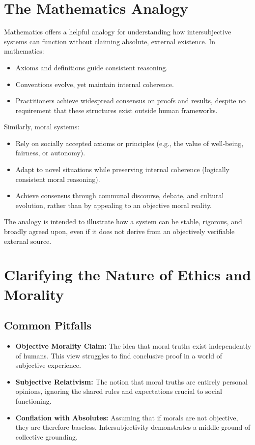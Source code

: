 \documentclass{article}
\begin{document}
\section{The Mathematics Analogy}

Mathematics offers a helpful analogy for understanding how intersubjective systems can function without claiming absolute, external existence. In mathematics:

\begin{itemize}
  \item Axioms and definitions guide consistent reasoning.
  \item Conventions evolve, yet maintain internal coherence.
  \item Practitioners achieve widespread consensus on proofs and results, despite no requirement that these structures exist outside human frameworks.
\end{itemize}

Similarly, moral systems:

\begin{itemize}
  \item Rely on socially accepted axioms or principles (e.g., the value of well-being, fairness, or autonomy).
  \item Adapt to novel situations while preserving internal coherence (logically consistent moral reasoning).
  \item Achieve consensus through communal discourse, debate, and cultural evolution, rather than by appealing to an objective moral reality.
\end{itemize}

The analogy is intended to illustrate how a system can be stable, rigorous, and broadly agreed upon, even if it does not derive from an objectively verifiable external source.

\section{Clarifying the Nature of Ethics and Morality}

\subsection{Common Pitfalls}

\begin{itemize}
  \item \textbf{Objective Morality Claim:} The idea that moral truths exist independently of humans. This view struggles to find conclusive proof in a world of subjective experience.
  \item \textbf{Subjective Relativism:} The notion that moral truths are entirely personal opinions, ignoring the shared rules and expectations crucial to social functioning.
  \item \textbf{Conflation with Absolutes:} Assuming that if morals are not objective, they are therefore baseless. Intersubjectivity demonstrates a middle ground of collective grounding.
\end{itemize}
\end{document}
